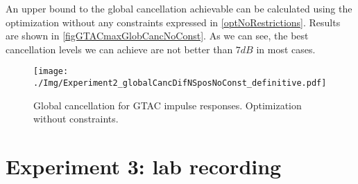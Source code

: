 An upper bound to the global cancellation achievable can be calculated using the optimization without any constraints expressed in \autoref{optNoRestrictions}. Results are shown in \autoref{figGTACmaxGlobCancNoConst}. As we can see, the best cancellation levels we can achieve are not better than $7\si{dB}$ in most cases.

\begin{figure}
	\centering
	\texttt{[image: ./Img/Experiment2\_globalCancDifNSposNoConst\_definitive.pdf]}
	\caption{Global cancellation for GTAC impulse responses. Optimization without constraints.}
	\label{figGTACmaxGlobCancNoConst}
\end{figure}

\section{Experiment 3: lab recording}
